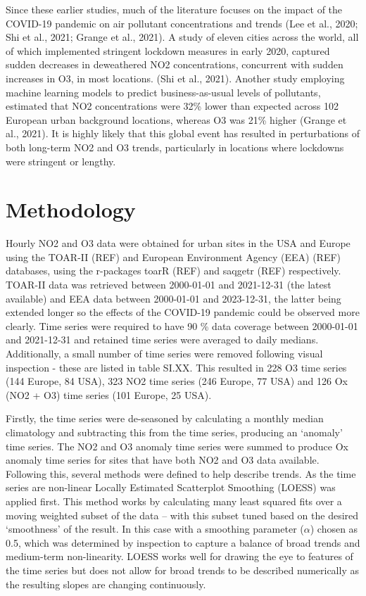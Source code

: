 \documentclass[journal abbreviation, manuscript]{copernicus}
\begin{document}
Since these earlier studies, much of the literature focuses on the impact of the COVID-19 pandemic on air pollutant concentrations and trends (Lee et al., 2020; Shi et al., 2021; Grange et al., 2021). A study of eleven cities across the world, all of which implemented stringent lockdown measures in early 2020, captured sudden decreases in deweathered NO2 concentrations, concurrent with sudden increases in O3, in most locations. (Shi et al., 2021). Another study employing machine learning models to predict business-as-usual levels of pollutants, estimated that NO2 concentrations were 32\% lower than expected across 102 European urban background locations, whereas O3 was 21\% higher (Grange et al., 2021). It is highly likely that this global event has resulted in perturbations of both long-term NO2 and O3 trends, particularly in locations where lockdowns were stringent or lengthy.



\section{Methodology} \label{sect:method}
Hourly NO2 and O3 data were obtained for urban sites in the USA and Europe using the TOAR-II (REF) and European Environment Agency (EEA) (REF) databases, using the r-packages toarR (REF) and saqgetr (REF) respectively. TOAR-II data was retrieved between 2000-01-01 and 2021-12-31 (the latest available) and EEA data between 2000-01-01 and 2023-12-31, the latter being extended longer so the effects of the COVID-19 pandemic could be observed more clearly. Time series were required to have 90 \% data coverage between 2000-01-01 and 2021-12-31 and retained time series were averaged to daily medians. Additionally, a small number of time series were removed following visual inspection - these are listed in table SI.XX. This resulted in 228 O3 time series (144 Europe, 84 USA), 323 NO2 time series (246 Europe, 77 USA) and 126 Ox (NO2 + O3) time series (101 Europe, 25 USA).

Firstly, the time series were de-seasoned by calculating a monthly median climatology and subtracting this from the time series, producing an ‘anomaly’ time series. The NO2 and O3 anomaly time series were summed to produce Ox anomaly time series for sites that have both NO2 and O3 data available. Following this, several methods were defined to help describe trends. As the time series are non-linear Locally Estimated Scatterplot Smoothing (LOESS) was applied first. This method works by calculating many least squared fits over a moving weighted subset of the data – with this subset tuned based on the desired ‘smoothness’ of the result. In this case with a smoothing parameter ($\alpha$) chosen as 0.5, which was determined by inspection to capture a balance of broad trends and medium-term non-linearity. LOESS works well for drawing the eye to features of the time series but does not allow for broad trends to be described numerically as the resulting slopes are changing continuously. 
\end{document}

